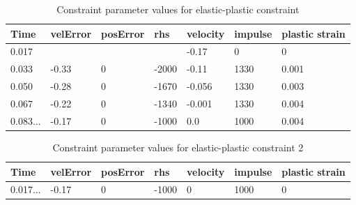 \begin {table}[htb!]
\begin{center}
\begin{tabular}{|l| l| l|l|l|l|l|}
\hline
{\bf Time} & 
{\bf velError} & {\bf posError} & {\bf rhs} &
{\bf velocity} & 
{\bf impulse} & 
{\bf plastic strain} \\  \hline
0.017 &          &    &          & -0.17 & 0 & 0 \\  \hline
0.033 &  -0.33 & 0 & -2000 & -0.11 &  1330 & 0.001 \\  \hline
0.050 &  -0.28 & 0 & -1670 & -0.056 &  1330 & 0.003 \\  \hline
0.067 &  -0.22 & 0 & -1340 &  -0.001&  1330 & 0.004\\  \hline
0.083... &  -0.17 & 0 & -1000 &  0.0&  1000 & 0.004\\  \hline
\end {tabular}
\end{center}
\caption {Constraint parameter values for elastic-plastic constraint} \label{tab:epBlockValues} 
\end {table}

\begin {table}[htb!]
\begin{center}
\begin{tabular}{|l| l| l|l|l|l|l|}
\hline
{\bf Time} & 
{\bf velError} & {\bf posError} & {\bf rhs} &
{\bf velocity} & 
{\bf impulse} & 
{\bf plastic strain} \\  \hline
0.017... & -0.17  & 0 & -1000 & 0       & 1000 & 0 \\  \hline
\end {tabular}
\end{center}
\caption {Constraint parameter values for elastic-plastic constraint 2} \label{tab:ep2BlockValues} 
\end {table}


